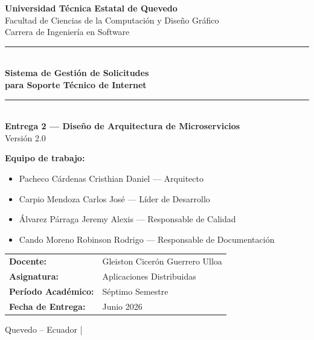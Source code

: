 \documentclass[12pt, a4paper]{report}
\begin{document}
\onehalfspacing

\begin{titlepage}
  \thispagestyle{empty}
  \centering
  \vspace*{0.5cm}

  {\Large\bfseries Universidad Técnica Estatal de Quevedo\\[0.4cm]}
  {\normalsize Facultad de Ciencias de la Computación y Diseño Gráfico\\[0.1cm]
   Carrera de Ingeniería en Software\\[1.5cm]}

  \rule{\linewidth}{1.5pt}\\[0.4cm]
  {\LARGE\bfseries
    Sistema de Gestión de Solicitudes\\[0.2cm]
    para Soporte Técnico de Internet}\\[0.4cm]
  \rule{\linewidth}{1.5pt}\\[1cm]

  {\large\bfseries Entrega 2 --- Diseño de Arquitectura de Microservicios\\[0.3cm]}
  {\normalsize Versión 2.0\\[1.5cm]}

  \begin{flushleft}
    \textbf{Equipo de trabajo:}\\[0.4cm]
    \hspace{1cm}
    \begin{minipage}{0.85\textwidth}
      \begin{itemize}
        \setlength{\itemsep}{0.3cm}
        \item Pacheco Cárdenas Cristhian Daniel \quad --- \quad Arquitecto
        \item Carpio Mendoza Carlos José \quad --- \quad Líder de Desarrollo
        \item Álvarez Párraga Jeremy Alexis \quad --- \quad Responsable de Calidad
        \item Cando Moreno Robinson Rodrigo \quad --- \quad Responsable de Documentación
      \end{itemize}
    \end{minipage}
  \end{flushleft}

  \vspace{1cm}

  \begin{flushleft}
    \hspace{1cm}
    \begin{tabular}{ll}
      \textbf{Docente:}            & Gleiston Cicerón Guerrero Ulloa \\[0.3cm]
      \textbf{Asignatura:}         & Aplicaciones Distribuidas \\[0.3cm]
      \textbf{Período Académico:}  & Séptimo Semestre \\[0.3cm]
      \textbf{Fecha de Entrega:}   & Junio 2026 \\
    \end{tabular}
  \end{flushleft}

  \vfill
  {\small Quevedo -- Ecuador \quad | }
\end{titlepage}
\end{document}
